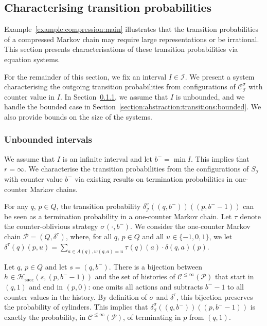 \documentclass[a4paper,UKenglish,cleveref,autoref,thm-restate,colorlinks]{lipics-v2021}
\newcommand{\mdpStateSpace}{S}
\newcommand{\mdpTrans}{\delta}
\newcommand{\histPart}{\mathcal{H}}
\newcommand{\hist}{h}
\newcommand{\weight}{w}
\newcommand{\weightVal}{u}
\newcommand{\ocStateSpace}{Q}
\newcommand{\ocState}{q}
\newcommand{\ocStateB}{p}
\newcommand{\ocConfig}{s}
\newcommand{\ocActionSpace}{A}
\newcommand{\ocAction}{a}
\newcommand{\ocTrans}{\delta}
\newcommand{\counterUB}{r}
\newcommand{\mchain}{\mathcal{C}}
\newcommand{\ocChain}{\mathcal{P}}
\newcommand{\ocChainFin}[2]{\mchain^{\leq #2}(#1)}
\newcommand{\intPart}{\mathcal{I}}
\newcommand{\interval}{I}
\newcommand{\intBound}{b}
\newcommand{\intLB}{\intBound^-}
\newcommand{\compressChainStrat}[1]{\mchain^{#1}_{\intPart}}
\newcommand{\compressChain}{\compressChainStrat{\strat}}
\newcommand{\compressChainStateSpace}{\mdpStateSpace_{\intPart}}
\newcommand{\compressChainTransTemplate}[2]{\mdpTrans^{#1}_{#2}}
\newcommand{\compressChainTrans}{\compressChainTransTemplate{\strat}{\intPart}}
\newcommand{\succHist}[2]{\histPart_{\mathsf{succ}}(#1, #2)}
\newcommand{\stratGeneric}[1]{{\sigma_{#1}}}
\newcommand{\strat}{\stratGeneric{}}
\newcommand{\stratBGeneric}[1]{{\tau_{#1}}}
\newcommand{\stratB}{\stratBGeneric{}}
\begin{document}
\subsection{Characterising transition probabilities}\label{section:abstraction:transitions}

Example~\ref{example:compression:main} illustrates that the transition probabilities of a compressed Markov chain may require large representations or be irrational.
This section presents characterisations of these transition probabilities via equation systems.

For the remainder of this section, we fix an interval $\interval\in\intPart$.
We present a system characterising the outgoing transition probabilities from configurations of $\compressChain$ with counter value in $\interval$.
In Section~\ref{section:abstraction:transitions:unbounded}, we assume that $\interval$ is unbounded, and we handle the bounded case in Section~\ref{section:abstraction:transitions:bounded}.
We also provide bounds on the size of the systems.

\subsubsection{Unbounded intervals}\label{section:abstraction:transitions:unbounded}
We assume that $\interval$ is an infinite interval and let $\intLB=\min\interval$.
This implies that $\counterUB=\infty$.
We characterise the transition probabilities from the configurations of $\compressChainStateSpace$ with counter value $\intLB$ via existing results on termination probabilities in one-counter Markov chains.

For any $\ocState$, $\ocStateB\in\ocStateSpace$, the transition probability $\compressChainTrans((\ocState, \intLB))((\ocStateB, \intLB-1))$ can be seen as a termination probability in a one-counter Markov chain.
Let $\stratB$ denote the counter-oblivious strategy $\strat(\cdot, \intLB)$.
We consider the one-counter Markov chain $\ocChain=(\ocStateSpace, \ocTrans^\stratB)$, where, for all $\ocState$, $\ocStateB\in\ocStateSpace$ and all $\weightVal\in\{-1, 0, 1\}$, we let $\ocTrans^\stratB(\ocState)(\ocStateB, \weightVal) = \sum_{\ocAction\in\ocActionSpace(\ocState), \weight(\ocState, \ocAction)=\weightVal}\stratB(\ocState)(\ocAction)\cdot\ocTrans(\ocState, \ocAction)(\ocStateB)$.

Let $\ocState$, $\ocStateB\in\ocStateSpace$ and let $\ocConfig = (\ocState, \intLB)$.
There is a bijection between $\hist\in\succHist{\ocConfig}{(\ocStateB, \intLB-1)}$ and the set of histories of $\ocChainFin{\ocChain}{\infty}$ that start in $(\ocState, 1)$ and end in $(\ocStateB, 0)$: one omits all actions and subtracts $\intLB-1$ to all counter values in the history.
By definition of $\strat$ and $\ocTrans^\stratB$, this bijection preserves the probability of cylinders.
This implies that $\compressChainTrans((\ocState, \intLB))((\ocStateB, \intLB-1))$ is exactly the probability, in $\ocChainFin{\ocChain}{\infty}$, of terminating in $\ocStateB$ from $(\ocState, 1)$.
\end{document}
